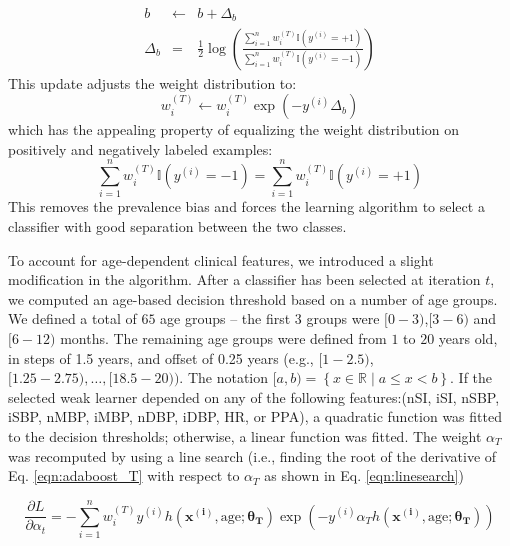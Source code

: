 \documentclass[
   technote
]{phildoc}
\newcommand{\ie}{i.e.,}
\newcommand{\eg}{e.g.,}
\newcommand{\eq}{Eq.}
\begin{document}
\begin{eqnarray}
b &\gets& b + \Delta_b \\
\Delta_b &=& \frac{1}{2}\log\left(\frac{\sum_{i=1}^n w_i^{(T)} \mathbb{I}(y^{(i)} = +1)}{\sum_{i=1}^n w_i^{(T)} \mathbb{I}(y^{(i)} = -1)}\right) \end{eqnarray}
This update adjusts the weight distribution to:
\begin{equation}
w_i^{(T)} \gets w_i^{(T)}\exp(-y^{(i)}\Delta_b)
\end{equation}
which has the appealing property of equalizing the weight distribution on positively and negatively labeled examples:
\begin{equation}
\sum_{i=1}^n w_i^{(T)} \mathbb{I}(y^{(i)} = -1) = \sum_{i=1}^n w_i^{(T)} \mathbb{I}(y^{(i)} = +1)
\end{equation}
This removes the prevalence bias and forces the learning algorithm to select a classifier with good separation between the two classes.

To account for age-dependent clinical features, we introduced a slight modification in the algorithm. After a classifier has been selected at iteration $t$, we computed an age-based decision threshold based on a number of age groups. We defined a total of $65$ age groups -- the first 3 groups were $[0-3)$,$[3-6)$ and $[6-12)$ months. The remaining age groups were defined from $1$ to $20$ years old, in steps of 1.5 years, and offset of 0.25 years (\eg{} $[1-2.5)$,$[1.25-2.75),\dots,[18.5-20))$. The notation $[a,b) = \left\{x \in \mathbb{R} \mid a\leq x<b \right\}$. If the selected weak learner depended on any of the following features:(nSI, iSI, nSBP, iSBP, nMBP, iMBP, nDBP, iDBP, HR, or PPA), a quadratic function was fitted to the decision thresholds; otherwise, a linear function was fitted. The weight $\alpha_T$ was recomputed by using a line search (\ie{} finding the root of the derivative of \eq{} \ref{eqn:adaboost_T} with respect to $\alpha_T$ as shown in \eq{} \ref{eqn:linesearch})


\begin{equation}
\label{eqn:linesearch}
\frac{\partial L}{\partial\alpha_{t}}= -\sum_{i=1}^n w_i^{(T)}y^{(i)} h\left(\bm{x^{(i)}},\text{age}; \bm{\theta_T}\right) \exp\left(-y^{(i)} \alpha_T h\left(\bm{x^{(i)}},\text{age}; \bm{\theta_T}\right)\right)
\end{equation}
\end{document}
